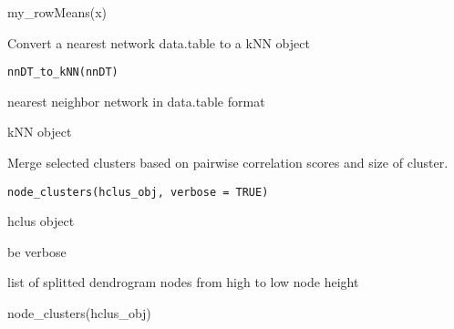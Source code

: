 \documentclass[a4paper]{book}
\begin{document}
%
\begin{Examples}
\begin{ExampleCode}
    my_rowMeans(x)
\end{ExampleCode}
\end{Examples}
%
\begin{Description}\relax
Convert a nearest network data.table to a kNN object
\end{Description}
%
\begin{Usage}
\begin{verbatim}
nnDT_to_kNN(nnDT)
\end{verbatim}
\end{Usage}
%
\begin{Arguments}
\begin{ldescription}
\item[\code{nnDT}] nearest neighbor network in data.table format
\end{ldescription}
\end{Arguments}
%
\begin{Value}
kNN object
\end{Value}
%
\begin{Description}\relax
Merge selected clusters based on pairwise correlation scores and size of cluster.
\end{Description}
%
\begin{Usage}
\begin{verbatim}
node_clusters(hclus_obj, verbose = TRUE)
\end{verbatim}
\end{Usage}
%
\begin{Arguments}
\begin{ldescription}
\item[\code{hclus\_obj}] hclus object

\item[\code{verbose}] be verbose
\end{ldescription}
\end{Arguments}
%
\begin{Value}
list of splitted dendrogram nodes from high to low node height
\end{Value}
%
\begin{Examples}
\begin{ExampleCode}
    node_clusters(hclus_obj)
\end{ExampleCode}
\end{Examples}
\end{document}
